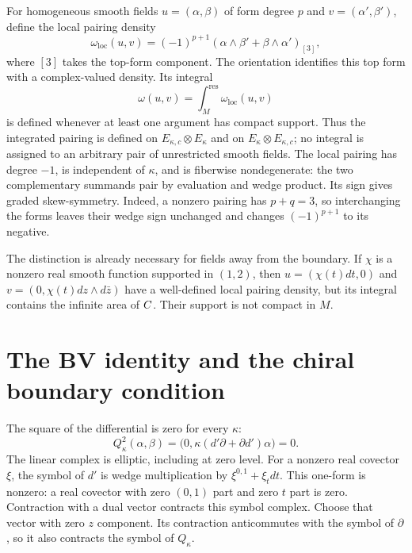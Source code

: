 For homogeneous smooth fields $u=(\alpha,\beta)$ of form degree $p$
and $v=(\alpha',\beta')$, define the local pairing density
\[
 \omega_{\mathrm{loc}}(u,v)=(-1)^{p+1}
       (\alpha\wedge\beta'+\beta\wedge\alpha')_{[3]},
\]
where $[3]$ takes the top-form component.  The orientation identifies
this top form with a complex-valued density.  Its integral
\[
 \omega(u,v)=\int_M^{\mathrm{res}}\omega_{\mathrm{loc}}(u,v)
\]
is defined whenever at least one argument has compact support.
Thus the integrated pairing is defined on
$E_{\kappa,c}\otimes E_\kappa$ and on
$E_\kappa\otimes E_{\kappa,c}$; no integral is assigned to an arbitrary
pair of unrestricted smooth fields.
The local pairing has degree $-1$, is independent of $\kappa$, and is
fiberwise nondegenerate: the two complementary summands pair by
evaluation and wedge product.  Its sign gives graded skew-symmetry.
Indeed, a nonzero pairing has $p+q=3$, so interchanging the forms leaves
their wedge sign unchanged and changes $(-1)^{p+1}$ to its negative.

The distinction is already necessary for fields away from the
boundary.  If $\chi$ is a nonzero real smooth function supported in
$(1,2)$, then $u=(\chi(t)dt,0)$ and
$v=(0,\chi(t)dz\wedge d\bar z)$ have a well-defined local pairing
density, but its integral contains the infinite area of $C$.
Their support is not compact in $M$.

\section{The BV identity and the chiral boundary condition}

The square of the differential is zero for every $\kappa$:
\[
 Q_\kappa^2(\alpha,\beta)
 =\bigl(0,\kappa(d'\partial+\partial d')\alpha\bigr)=0.
\]
The linear complex is elliptic, including at zero level.  For a
nonzero real covector $\xi$, the symbol of $d'$ is wedge multiplication
by $\xi^{0,1}+\xi_tdt$.  This one-form is nonzero: a real covector
with zero $(0,1)$ part and zero $t$ part is zero.  Contraction with a
dual vector contracts this symbol complex.  Choose that vector with
zero $z$ component.  Its contraction anticommutes with the symbol of
$\partial$, so it also contracts the symbol of $Q_\kappa$.

